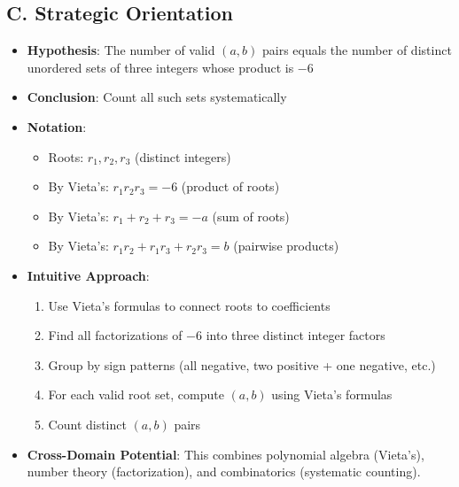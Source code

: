 \documentclass[12pt]{article}
\begin{document}
\begin{problemconfigbox}
\subsection*{C. Strategic Orientation}
\begin{itemize}[leftmargin=*]
    \item \textbf{Hypothesis}: The number of valid $(a,b)$ pairs equals the number of distinct unordered sets of three integers whose product is $-6$
    \item \textbf{Conclusion}: Count all such sets systematically
    \item \textbf{Notation}: 
    \begin{itemize}
        \item Roots: $r_1, r_2, r_3$ (distinct integers)
        \item By Vieta's: $r_1 r_2 r_3 = -6$ (product of roots)
        \item By Vieta's: $r_1 + r_2 + r_3 = -a$ (sum of roots)
        \item By Vieta's: $r_1 r_2 + r_1 r_3 + r_2 r_3 = b$ (pairwise products)
    \end{itemize}
    \item \textbf{Intuitive Approach}: 
    \begin{enumerate}
        \item Use Vieta's formulas to connect roots to coefficients
        \item Find all factorizations of $-6$ into three distinct integer factors
        \item Group by sign patterns (all negative, two positive + one negative, etc.)
        \item For each valid root set, compute $(a,b)$ using Vieta's formulas
        \item Count distinct $(a,b)$ pairs
    \end{enumerate}
    \item \textbf{Cross-Domain Potential}: This combines polynomial algebra (Vieta's), number theory (factorization), and combinatorics (systematic counting).
\end{itemize}
\end{problemconfigbox}
\end{document}

